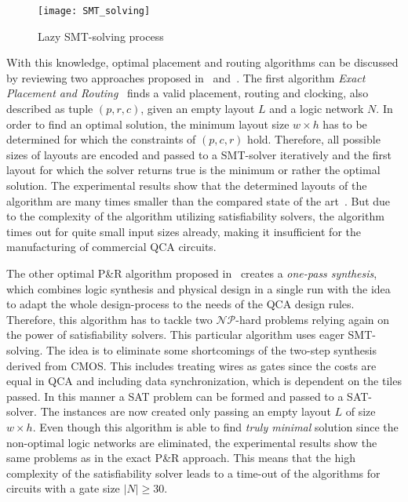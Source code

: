 \begin{figure}
	\centering
	\texttt{[image: SMT\_solving]}
	\caption{Lazy SMT-solving  process~\cite{SMT}}\label{fig:SMT_solving}
\end{figure}

With this knowledge, optimal placement and routing algorithms can be discussed by reviewing two approaches proposed in~\cite{walter2018exact} and~\cite{walter2021one}. The first algorithm \emph{Exact Placement and Routing}~\cite{walter2018exact} finds a valid placement, routing and clocking, also described as tuple $(p, r, c)$, given an empty layout $L$ and a logic network $N$. In order to find an optimal solution, the minimum layout size $w \times h$ has to be determined for which the constraints of $(p, c, r)$ hold. Therefore, all possible sizes of layouts are encoded and passed to a SMT-solver iteratively and the first layout for which the solver returns true is the minimum or rather the optimal solution. The experimental results show that the determined layouts of the algorithm are many times smaller than the compared state of the art~\cite{fontes, trindade2016placement}. But due to the complexity of the algorithm utilizing satisfiability solvers, the algorithm times out for quite small input sizes already, making it insufficient for the manufacturing of commercial QCA circuits.

The other optimal P\&R algorithm proposed in~\cite{walter2021one} creates a \emph{one-pass synthesis}, which combines logic synthesis and physical design in a single run with the idea to adapt the whole design-process to the needs of the QCA design rules. Therefore, this algorithm has to tackle two $\mathcal{NP}$-hard problems relying again on the power of satisfiability solvers. This particular algorithm uses eager SMT-solving. The idea is to eliminate some shortcomings of the two-step synthesis derived from CMOS. This includes treating wires as gates since the costs are equal in QCA and including data synchronization, which is dependent on the tiles passed. In this manner a SAT problem can be formed and passed to a SAT-solver. The instances are now created only passing an empty layout $L$ of size $w \times h$. Even though this algorithm is able to find \emph{truly minimal} solution since the non-optimal logic networks are eliminated, the experimental results show the same problems as in the exact P\&R approach. This means that the high complexity of the satisfiability solver leads to a time-out of the algorithms for circuits with a gate size $|N| \geq 30$.

